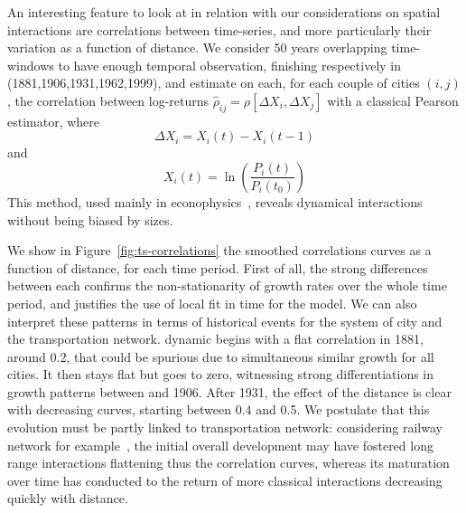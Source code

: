 \documentclass[Royal,sageh,times]{sagej}
\begin{document}
An interesting feature to look at in relation with our considerations on spatial interactions are correlations between time-series, and more particularly their variation as a function of distance. We consider 50 years overlapping time-windows to have enough temporal observation, finishing respectively in (1881,1906,1931,1962,1999), and estimate on each, for each couple of cities $(i,j)$, the correlation between log-returns $\hat{\rho}_{ij}=\rho\left[\Delta X_i, \Delta X_j\right]$ with a classical Pearson estimator, where
\[\Delta X_i = X_i(t) - X_i(t-1)\]
and
\[X_i(t) = \ln\left(\frac{P_i(t)}{P_i(t_0)}\right)\]
This method, used mainly in econophysics~\citep{mantegna1999introduction}, reveals dynamical interactions without being biased by sizes.

We show in Figure~\ref{fig:ts-correlations} the smoothed correlations curves as a function of distance, for each time period. First of all, the strong differences between each  confirms the non-stationarity of growth rates over the whole time period, and justifies the use of local fit in time for the model. We can also interpret these patterns in terms of historical events for the system of city and the transportation network.  dynamic  begins with a flat correlation in 1881, around 0.2, that could be spurious due to simultaneous similar growth for all cities. It then stays flat but goes to zero, witnessing strong differentiations in growth patterns between  and 1906. After 1931, the effect of the distance is clear with decreasing curves, starting between 0.4 and 0.5. We postulate that this evolution must be partly linked to  transportation network: considering railway network for example~\citep{thevenin2013mapping}, the initial overall development may have fostered long range interactions flattening thus the correlation curves, whereas its maturation over time has conducted to the return of more classical interactions decreasing quickly with distance.
\end{document}
